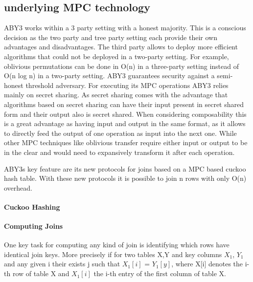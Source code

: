 \subsection{underlying MPC technology}
ABY3 works within a 3 party setting with a honest majority. This is a conscious decision as the two party and tree party setting each provide their own advantages and disadvantages.
The third party allows to deploy more efficient algorithms that could not be deployed in a two-party setting. For example, oblivious permutations can be done in O(n) in a three-party setting instead of O(n log n) in a two-party setting.
 ABY3 guarantees security against a semi-honest threshold adversary. For executing its MPC operations ABY3 relies mainly on secret sharing. As secret sharing comes with the advantage that algorithms based on  secret sharing can have their input present in secret shared form and their output also is secret shared. When considering composability this is a great advantage as having input and output in the same format, as it allows to directly feed the output of one operation as input into the next one. While other MPC techniques like oblivious transfer require either input or output to be in the clear and would need to expansively transform it after each operation. 
 
ABY3s key feature are its new protocols for joins based on a MPC based cuckoo hash table. With these new protocols it is possible to join n rows with only O(n) overhead.



\paragraph{ Cuckoo Hashing }


\paragraph{Computing Joins}
One key task for computing any kind of join is identifying which rows have identical join keys. More precisely if for two tables X,Y and key columns $X_1$, $Y_1$ and any given i  their exists j such that $X_1[i]$ = $Y_1[y]$, where X[i] denotes the i-th row of table X and $ X_1[i] $ the i-th entry of the first column of table X. 

